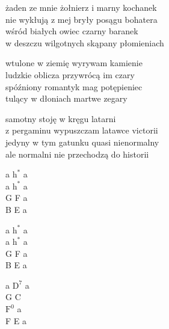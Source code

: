\begin{text}
    żaden ze mnie żołnierz i marny kochanek\\
    nie wykłują z mej bryły posągu bohatera\\
    wśród białych owiec czarny baranek\\
    w deszczu wilgotnych skąpany płomieniach

    wtulone w ziemię wyrywam kamienie\\
    ludzkie oblicza przywrócą im czary\\
    spóźniony romantyk mag potępieniec\\
    tulący w dłoniach martwe zegary

    samotny stoję w kręgu latarni\\
    z pergaminu wypuszczam latawce victorii\\
    jedyny w tym gatunku quasi nienormalny\\
    ale normalni nie przechodzą do historii
\end{text}
\begin{chord}
    a $\mathrm{h^{*}}$ a\\
    a $\mathrm{h^{*}}$ a\\
    G F a\\
    B E a

    a $\mathrm{h^{*}}$ a\\
    a $\mathrm{h^{*}}$ a\\
    G F a\\
    B E a

    a $\mathrm{D^{7}}$ a\\
    G C\\
    $\mathrm{F^{0}}$ a\\
    F E a

    \\
\end{chord}
